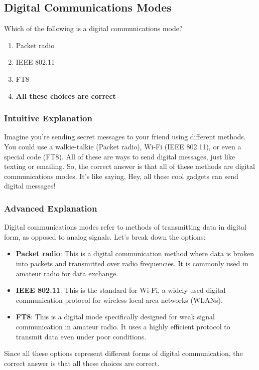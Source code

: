 \subsection{Digital Communications Modes}
\label{T8D01}

\begin{tcolorbox}[colback=gray!10!white,colframe=black!75!black,title=T8D01]
Which of the following is a digital communications mode?
\begin{enumerate}[label=\Alph*]
    \item Packet radio
    \item IEEE 802.11
    \item FT8
    \item \textbf{All these choices are correct}
\end{enumerate}
\end{tcolorbox}

\subsubsection{Intuitive Explanation}
Imagine you're sending secret messages to your friend using different methods. You could use a walkie-talkie (Packet radio), Wi-Fi (IEEE 802.11), or even a special code (FT8). All of these are ways to send digital messages, just like texting or emailing. So, the correct answer is that all of these methods are digital communications modes. It's like saying, Hey, all these cool gadgets can send digital messages!

\subsubsection{Advanced Explanation}
Digital communications modes refer to methods of transmitting data in digital form, as opposed to analog signals. Let's break down the options:

\begin{itemize}
    \item \textbf{Packet radio}: This is a digital communication method where data is broken into packets and transmitted over radio frequencies. It is commonly used in amateur radio for data exchange.
    \item \textbf{IEEE 802.11}: This is the standard for Wi-Fi, a widely used digital communication protocol for wireless local area networks (WLANs).
    \item \textbf{FT8}: This is a digital mode specifically designed for weak signal communication in amateur radio. It uses a highly efficient protocol to transmit data even under poor conditions.
\end{itemize}

Since all these options represent different forms of digital communication, the correct answer is that all these choices are correct. 

